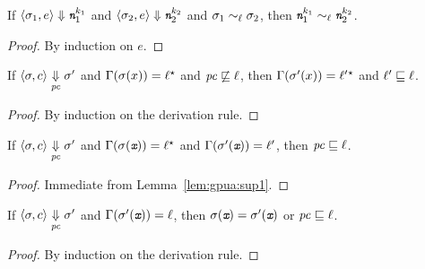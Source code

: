 \begin{myLemma}
\label{lem:gpua:exp}
If $\langle \sigma_1, e \rangle \Downarrow \emph{\texttt{n}}_1^{k_1}$ and $\langle 
\sigma_2, e \rangle \Downarrow \emph{\texttt{n}}_2^{k_2}$ and $\sigma_1 \sim_\ell \sigma_2$,
then $\emph{\texttt{n}}_1^{k_1} \sim_\ell \emph{\texttt{n}}_2^{k_2}$.
\end{myLemma}
\begin{proof}
By induction on $e$.
\end{proof}


\begin{myLemma}
\label{lem:gpua:sup1}
If $\langle \sigma, c \rangle \underset{\mathit{pc}}{\Downarrow} \sigma'$ and
$\Gamma(\sigma(x)) = \ell{}^\star $ and $\mathit{pc} \not\sqsubseteq \ell$, then
$\Gamma(\sigma'(x)) = \ell'{}^\star$ and $\ell' \sqsubseteq \ell$.
\end{myLemma}
\begin{proof}
By induction on the derivation rule.
\end{proof}

\begin{mycor}
\label{cor:gpua:cor1}
If $\langle \sigma, c \rangle \underset{\mathit{pc}}{\Downarrow} \sigma'$ and
$\Gamma(\sigma(\emph{\texttt{x}})) = \ell{}^\star $ and
$\Gamma(\sigma'(\emph{\texttt{x}})) = \ell'$, then 
$\mathit{pc} \sqsubseteq \ell$.
\end{mycor}
\begin{proof}
Immediate from Lemma~\ref{lem:gpua:sup1}.
\end{proof}

\begin{myLemma}[$\pc$-lemma]
\label{lem:gpua:pcl}
If $\langle \sigma, c \rangle \underset{\mathit{pc}}{\Downarrow} \sigma'$ and
$\Gamma(\sigma'(\emph{\texttt{x}})) = \ell$, then $\sigma(\emph{\texttt{x}}) =
\sigma'(\emph{\texttt{x}})$ or 
$\mathit{pc} \sqsubseteq \ell$.
\end{myLemma}
\begin{proof}
By induction on the derivation rule.
\end{proof}

